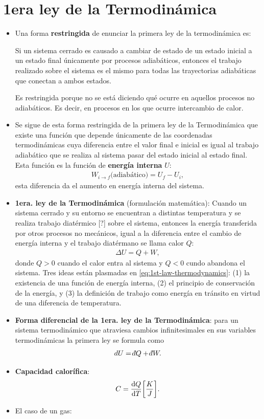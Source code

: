 \section{1era ley de la Termodinámica}
\begin{itemize}
\item Una forma \textbf{restringida} de enunciar la primera ley 
de la termodinámica es:

Si un sistema cerrado es causado a cambiar de estado de un estado 
inicial a un estado final únicamente por procesos adiabáticos, entonces
el trabajo realizado sobre el sistema es el mismo para todas las trayectorias
adiabáticas que conectan a ambos estados. 

Es restringida porque no se está diciendo qué ocurre en 
aquellos procesos no adiabáticos. Es decir, en procesos
en los que ocurre intercambio de calor. 
\item Se sigue de esta forma restringida de la primera ley de la 
Termodinámica que existe una función que depende únicamente
de las coordenadas termodinámicas cuya diferencia entre el valor
final e inicial es igual al trabajo adiabático que se realiza al
sistema pasar del estado inicial al estado final. Esta función 
es la función de \textbf{energía interna} $U$: 
\begin{align}
W_{i\to f}\text{(adiabático)}=U_f-U_i,
\end{align}
esta diferencia da el aumento en energía interna del sistema. 
\item  \textbf{1era. ley de la Termodinámica} (formulación 
matemática): 
Cuando un sistema cerrado y su entorno se encuentran a distintas
temperatura y se realiza trabajo diatérmico [?] sobre el sistema,
entonces la energía transferida por otros procesos no mecánicos, 
igual a la diferencia entre el cambio de energía interna y el 
trabajo diatérmano se llama calor $Q$:
\begin{align}
  \Delta U = Q + W,
  \label{eq:1st-law-thermodynamics}
\end{align}
donde $Q>0$ cuando el calor entra al sistema y $Q<0$ cundo
abandona el sistema. Tres ideas están plasmadas en 
\eqref{eq:1st-law-thermodynamics}: (1) la existencia de una 
función de energía interna, (2) el principio de conservación de 
la energía, y (3) la definición de trabajo como energía en tránsito
en virtud de una diferencia de temperatura.
\item \textbf{Forma diferencial de la 1era. ley de la Termodinámica}:
para un sistema termodinámico que atraviesa cambios infinitesimales 
en sus variables termodinámicas la primera ley se formula como
\begin{align}
  dU = \dbar Q + \dbar W.
  \label{eq:1st-law-thermodynamics_diffForm}
\end{align}
\item \textbf{Capacidad calorífica}: 
\begin{align}
  C=\dv{Q}{T} \qty[\frac{K}{J}]
  \label{eq:heat-capacity}.
\end{align}
\item El caso de un gas:


\end{itemize}

